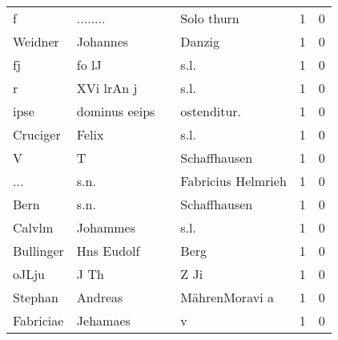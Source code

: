 \begin{tabular}{llllrr}
                        f &                           ........ &             &                                  Solo thurn &          1 &         0 \\
                  Weidner &                           Johannes &             &                                      Danzig &          1 &         0 \\
                       fj &                              fo lJ &             &                                        s.l. &          1 &         0 \\
                        r &                         XVi lrAn j &             &                                        s.l. &          1 &         0 \\
                     ipse &                      dominus eeips &             &                                ostenditur.  &          1 &         0 \\
                 Cruciger &                              Felix &             &                                        s.l. &          1 &         0 \\
                        V &                                  T &             &                                Schaffhausen &          1 &         0 \\
                      ... &                               s.n. &             &                          Fabricius Helmrieh &          1 &         0 \\
                     Bern &                               s.n. &             &                                Schaffhausen &          1 &         0 \\
                   Calvlm &                           Johammes &             &                                        s.l. &          1 &         0 \\
                Bullinger &                         Hns Eudolf &             &                                        Berg &          1 &         0 \\
                    oJLju &                               J Th &             &                                        Z Ji &          1 &         0 \\
                  Stephan &                            Andreas &             &                              MährenMoravi a &          1 &         0 \\
                Fabriciae &                           Jehamaes &             &                                           v &          1 &         0 \\

\end{tabular}
